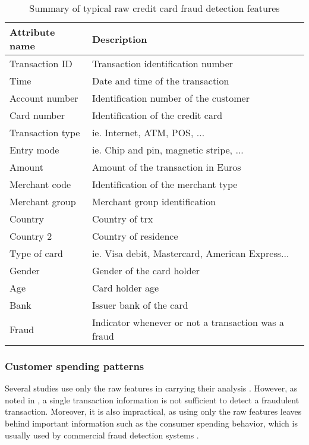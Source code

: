 	\begin{table}[!t]
   \centering
   \footnotesize
   \begin{tabular}{l l}
   \hline
   \textbf{Attribute name} & \textbf{Description}\\
   \hline
		Transaction ID & Transaction identification number \\
   Time & Date and time of the transaction\\
   Account number & Identification number of the customer\\
   Card number & Identification of the credit card\\
   Transaction type & ie. Internet, ATM, POS, ...\\
	 Entry mode & ie. Chip and pin, magnetic stripe, ...\\
   Amount & Amount of the transaction in Euros\\
   Merchant code & Identification of the merchant type\\
   Merchant group & Merchant group identification\\
   Country & Country of trx\\
   Country 2 & Country of residence \\
   Type of card & ie. Visa debit, Mastercard, American Express...\\
   Gender & Gender of the card holder\\
   Age & Card holder age\\
   Bank & Issuer bank of the card\\
   Fraud & Indicator whenever or not a transaction was a fraud\\
   \hline
   \end{tabular}
   \caption{Summary of typical raw credit card fraud detection features}
   \label{tab:4:raw_features}
   \end{table}
	
	\subsubsection{Customer spending patterns}
	\label{sec:4:frad:features_agg}
	
  Several studies use only the raw features in carrying  their analysis 
  \citep{Brause1999a,Minegishi2011,Panigrahi2009,Sanchez2009}. However, as noted in 
  \citep{Bolton2001}, a single transaction information is not sufficient to detect a fraudulent 
  transaction. Moreover, it is also impractical, as using only the raw features leaves behind 
  important information such as the consumer spending behavior, which is usually used by commercial 
  fraud detection systems \citep{Whitrow2008}.
	
